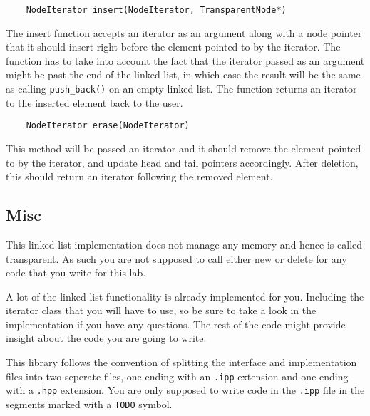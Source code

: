 \documentclass{article}
\begin{document}
\begin{lstlisting}
    NodeIterator insert(NodeIterator, TransparentNode*)
\end{lstlisting}
The insert function accepts an iterator as an argument along with a node
pointer that it should insert right before the element pointed to by the
iterator.  The function has to take into account the fact that the iterator
passed as an argument might be past the end of the linked list, in which case
the result will be the same as calling \texttt{push\_back()} on an empty
linked list.  The function returns an iterator to the inserted element back to
the user.

\begin{lstlisting}
    NodeIterator erase(NodeIterator)
\end{lstlisting}
This method will be passed an iterator and it should remove the element
pointed to by the iterator, and update head and tail pointers accordingly.
After deletion, this should return an iterator following the removed element.

\bigskip
\subsection{Misc}

This linked list implementation does not manage any memory and hence is called
transparent.  As such you are not supposed to call either new or delete for
any code that you write for this lab.

A lot of the linked list functionality is already implemented for you.
Including the iterator class that you will have to use, so be sure to take a
look in the implementation if you have any questions.  The rest of the code
might provide insight about the code you are going to write.

This library follows the convention of splitting the interface and
implementation files into two seperate files, one ending with an \texttt{.ipp}
extension and one ending with a \texttt{.hpp} extension.  You are only
supposed to write code in the \texttt{.ipp} file in the segments marked with a
\texttt{TODO} symbol.
\end{document}
